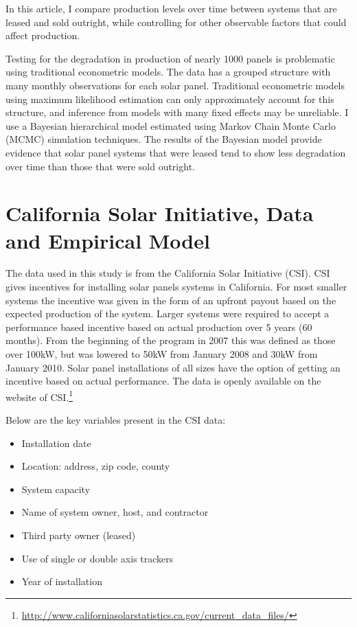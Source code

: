 \documentclass[12pt]{article}
\begin{document}
In this article, I compare production levels over time between systems that are leased and sold outright, while controlling for other observable factors that could affect production.

Testing for the degradation in production of nearly 1000 panels is problematic using traditional econometric models. The data has a grouped structure with many monthly observations for each solar panel. Traditional econometric models using maximum likelihood estimation can only approximately account for this structure, and inference from models with many fixed effects may be unreliable\citep{gelman_bayesian_2013}. I use a Bayesian hierarchical model estimated using Markov Chain Monte Carlo (MCMC) simulation techniques. The results of the Bayesian model provide evidence that solar panel systems that were leased tend to show less degradation over time than those that were sold outright.

\section{California Solar Initiative, Data and Empirical Model}

The data used in this study is from the California Solar Initiative (CSI). CSI gives incentives for installing solar panels systems in California. For most smaller systems the incentive was given in the form of an upfront payout based on the expected production of the system. Larger systems were required to accept a performance based incentive based on actual production over 5 years (60 months). From the beginning of the program in 2007 this was defined as those over 100kW, but was lowered to 50kW from January 2008 and 30kW from January 2010. Solar panel installations of all sizes have the option of getting an incentive based on actual performance. The data is openly available on the website of CSI.\footnote{\url{http://www.californiasolarstatistics.ca.gov/current_data_files/}}

Below are the key variables present in the CSI data:

\begin{itemize}
\item Installation date
\item Location: address, zip code, county
\item System capacity
\item Name of system owner, host, and contractor
\item Third party owner (leased)
\item Use of single or double axis trackers
\item Year of installation
\end{itemize}
\end{document}

